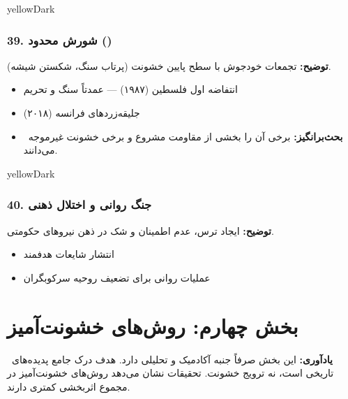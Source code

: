 \documentclass[a4paper,12pt]{article}
\newcommand{\debate}[1]{\textcolor{orangePrimary}{\faQuestionCircle\ \textbf{بحث‌برانگیز:}} #1}
\newcommand{\methodnum}[1]{\textcolor{purpleLight}{\textbf{#1.}}}
\begin{document}
\begin{methodcard}{yellowDark}
\subsubsection{\methodnum{39} شورش محدود ()}
\textbf{توضیح:} تجمعات خودجوش با سطح پایین خشونت (پرتاب سنگ، شکستن شیشه).

\begin{itemize}
  \item انتفاضه اول فلسطین (۱۹۸۷) — عمدتاً سنگ و تحریم
  \item جلیقه‌زردهای فرانسه (۲۰۱۸)
\end{itemize}
\begin{itemize}[label=\textcolor{yellowPrimary}{\faExclamationTriangle}]
  \item \debate{برخی آن را بخشی از مقاومت مشروع و برخی خشونت غیرموجه می‌دانند.}
\end{itemize}
\end{methodcard}

\begin{methodcard}{yellowDark}
\subsubsection{\methodnum{40} جنگ روانی و اختلال ذهنی}
\textbf{توضیح:} ایجاد ترس، عدم اطمینان و شک در ذهن نیروهای حکومتی.

\begin{itemize}
  \item انتشار شایعات هدفمند
  \item عملیات روانی برای تضعیف روحیه سرکوبگران
\end{itemize}
\end{methodcard}



\section{\textcolor{redPrimary}{\faFire} بخش چهارم: روش‌های خشونت‌آمیز}

\begin{notebox}[redPrimary]
\textcolor{redPrimary}{\faExclamationTriangle\ \textbf{یادآوری:}} این بخش صرفاً جنبه آکادمیک و تحلیلی دارد. هدف درک جامع پدیده‌های تاریخی است، نه ترویج خشونت. تحقیقات نشان می‌دهد روش‌های خشونت‌آمیز در مجموع اثربخشی کمتری دارند.
\end{notebox}
\end{document}
